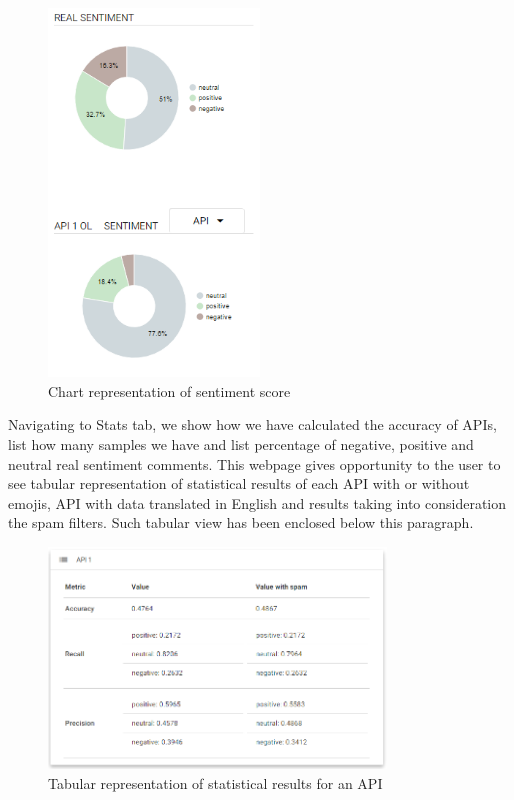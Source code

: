 \begin{figure}[ht]
	\centering	
	\includegraphics[width=0.5\textwidth]{04-framework/03-user-interface/images/pie_chart.png}
	\caption[Chart representation of sentiment score]{Chart representation of sentiment score \label{fig:pie-fragment}}
\end{figure}

Navigating to Stats tab, we show how we have calculated the accuracy of APIs, list how many samples we have and list percentage of negative, positive and neutral real sentiment comments. This webpage gives opportunity to the user to see tabular representation of statistical results of each API with or without emojis, API with data translated in English and results taking into consideration the spam filters. Such tabular view has been enclosed below this paragraph. 

\begin{figure}[ht]
	\centering
	\includegraphics[width=0.8\textwidth]{04-framework/03-user-interface/images/stats.png}
	\caption[Tabular representation of statistical results for an API]{Tabular representation of statistical results for an API \label{fig:stats}}
\end{figure}

